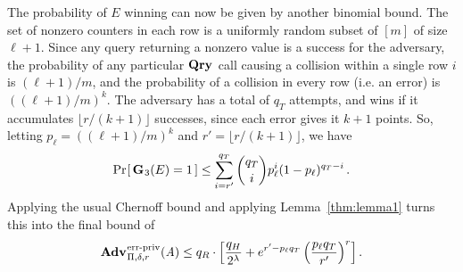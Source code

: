 The probability of $E$ winning can now be given by another binomial bound. The
set of nonzero counters in each row is a uniformly random subset of $[m]$ of
size $\ell+1$. Since any query returning a nonzero value is a success for the
adversary, the probability of any particular $\textup{\textbf{Qry}}\hspace{0.5pt}$ call causing a
collision within a single row $i$ is $(\ell+1)/m$, and the probability of a
collision in every row (i.e. an error) is $((\ell+1)/m)^k$. The adversary has a
total of $q_T$ attempts, and wins if it accumulates $\lfloor r/(k+1) \rfloor$
successes, since each error gives it $k+1$ points. So, letting
$p_\ell = ((\ell+1)/m)^k$ and $r' = \lfloor r/(k+1) \rfloor$, we have
\begin{equation}
   \Pr\hspace{-1pt}\left[\,\textup{\textbf{G}}\hspace{0.5pt}_3(E)=1\,\right] \le
     \sum_{i=r'}^{q_T} \binom{q_T}{i}p_\ell^i(1-p_\ell)^{q_T-i} \,.
\end{equation}
Applying the usual Chernoff bound and applying Lemma~\ref{thm:lemma1} turns this
into the final bound of
\begin{equation}
   \Adv{\erreps}_{\Pi,\delta,r}(\advA) \leq
     q_R \cdot \left[\frac{q_H}{2^\lambda} + e^{r'-p_\ell q_T}\left(\frac{p_\ell q_T}{r'}\right)^r\right].
\end{equation}
